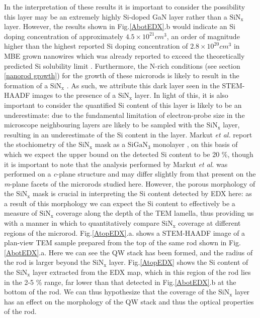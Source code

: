 In the interpretation of these results it is important to consider the possibility this layer may be an extremely highly Si-doped GaN layer rather than a $\mathrm{SiN_{x}}$ layer. However, the results shown in Fig.\ref{AbotEDX}.b would indicate an Si doping concentration of approximately $4.5 \times 10^{21} cm^{3}$, an order of magnitude higher than the highest reported Si doping concentration of $2.8 \times 10^{20} cm^{3}$ in MBE grown nanowires \cite{Fang2015} which was already reported to exceed the theoretically predicted Si solubility limit \cite{Neugebauer2003}. Furthermore, the N-rich conditions (see section \ref{nanorod growth}) for the growth of these microrods is likely to result in the formation of a $\mathrm{SiN_{x}}$ \cite{Neugebauer2003}. As such, we attribute this dark layer seen in the STEM-HAADF images to the presence of a $\mathrm{SiN_{x}}$ layer. In light of this, it is also important to consider the quantified Si content of this layer is likely to be an underestimate: due to the fundamental limitation of electron-probe size in the microscope neighbouring layers are likely to be sampled with the $\mathrm{SiN_{x}}$ layer, resulting in an underestimate of the Si content in the layer. Markut \textit{et al.} report the stochiometry of the $\mathrm{SiN_{x}}$ mask as a $\mathrm{SiGaN_{3}}$ monolayer \cite{Markurt2013}, on this basis of which we expect the upper bound on the detected Si content to be 20 \%, though it is important to note that the analysis performed by Markut \textit{et al}. was performed on a \textit{c}-plane structure and may differ slightly from that present on the \textit{m}-plane facets of the microrods studied here. However, the porous morphology of the $\mathrm{SiN_{x}}$ mask \cite{Kappers2007} is crucial in interpreting the Si content detected by EDX here: as a result of this morphology we can expect the Si content to effectively be a measure of $\mathrm{SiN_{x}}$ coverage along the depth of the TEM lamella, thus providing us with a manner in which to quantitatively compare $\mathrm{SiN_{x}}$ coverage at different regions of the microrod.
Fig.\ref{AtopEDX}.a. shows a STEM-HAADF image of a plan-view TEM sample prepared from the top of the same rod shown in Fig.\ref{AbotEDX}.a. Here we can see the QW stack has been formed, and the radius of the rod is larger beyond the $\mathrm{SiN_{x}}$ layer. Fig.\ref{AtopEDX} shows the Si content of the $\mathrm{SiN_{x}}$ layer extracted from the EDX map, which in this region of the rod lies in the 2-5 \% range, far lower than that detected in Fig.\ref{AbotEDX}.b at the bottom of the rod. We can thus hypothesize that the coverage of the $\mathrm{SiN_{x}}$ layer has an effect on the morphology of the QW stack and thus the optical properties of the rod.

